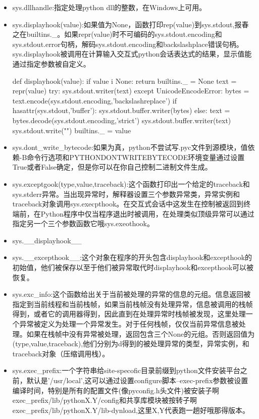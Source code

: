 \begin{itemize}
\item sys.dllhandle:指定处理python dll的整数，在Windows上可用。
\item sys.displayhook(value):如果值为None，函数打印rep(value)到sys.stdout,报春之在builtins.\_。如果repr(value)时不可编码的sys.stdout.encoding和sys.stdout.error句柄，解码sys.stdout.encoding和backslashplace错误句柄。
sys.displayhook被调用在计算输入交互式python会话表达式的结果，显示值能通过指定参数被自定义。
\begin{python}
def displayhook(value):
    if value i None:
        return 
    builtins._ = None
    text = repr(value)
    try:
        sys.stdout.writer(text)
    except UnicodeEncodeError:
        bytes = text.encode(sys.stdout.encoding,'backslashreplace')
        if hasattr(sys.stdout,'buffer'):
            sys.stdout.buffer.writer(bytes)
        else:
            text = bytes.decode(sys.stdout.encoding,'strict')
            sys.stdout.buffer.writer(text)
    sys.stdout.write("\n")
    builtins._ = value
\end{python}
\item sys.dont\_write\_bytecode:如果为真，python不尝试写.pyc文件到源模块，值依赖-B命令行选项和PYTHONDONTWRITEBYTECODE环境变量通过设置True或者False确定，但是你可以在你自己控制二进制文件生成。
\item sys.exceptgook(type,value,traceback):这个函数打印出一个给定的traceback和sys.stderr异常。当出现异常时，解释器设置三个参数异常类，异常实例和traceback对象调用sys.execpthook。在交互式会话中这发生在控制被返回到终端前，在Python程序中仅当程序退出时被调用，在处理类似顶级异常可以通过指定另一个三个参数函数它哦sys.exeothook。
\item sys.\_\_displayhook\_\_
\item sys.\_\_excepthook\_\_:这个对象在程序的开头包含displayhook和excepthook的初始值，他们被保存以至于他们被异常取代时displayhook和excepthook可以被恢复。
\item sys.exc\_info:这个函数给出关于当前被处理的异常的信息的元组。信息返回被指定到当前线程和当前栈帧，如果当前栈帧没有处理异常，信息被调用的栈帧得到，或者它的调用器得到，因此直到在处理异常时栈帧被发现，这里处理一个异常被定义为处理一个异常发生。对于任何栈帧，仅仅当前异常信息被处理。如果在栈帧中没有异常被处理，返回包含三个None的元组。否则返回值为(type,value,traceback),他们分别为d得到的被处理异常的类型，异常实例，和traceback对象（压缩调用栈）。
\item sys.exec\_prefix:一个字符串给site-specofic目录前缀到python文件安装平台之前，默认是'/usr/local',这可以通过设置configure脚本--exec-prefix参数被设置编译时间，特别是所有的配置文件(像pyconfig.h头文件)被安装子啊exec\_prefix/lib/pythonX.Y/config和共享库模块被按转子啊exec\_prefix/lib/pythonX.Y/lib-dynload,这里X,Y代表跑一趟好哦那得版本。

\end{itemize}
